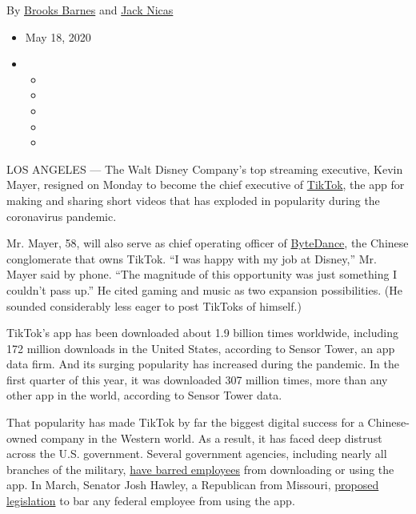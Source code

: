 By \href{https://www.nytimes3xbfgragh.onion/by/brooks-barnes}{Brooks
Barnes} and \href{https://www.nytimes3xbfgragh.onion/by/jack-nicas}{Jack
Nicas}

\begin{itemize}
\item
  May 18, 2020
\item
  \begin{itemize}
  \item
  \item
  \item
  \item
  \item
  \end{itemize}
\end{itemize}

LOS ANGELES --- The Walt Disney Company's top streaming executive, Kevin
Mayer, resigned on Monday to become the chief executive of
\href{https://www.nytimes3xbfgragh.onion/2019/10/19/style/high-school-tiktok-clubs.html?searchResultPosition=6}{TikTok},
the app for making and sharing short videos that has exploded in
popularity during the coronavirus pandemic.

Mr. Mayer, 58, will also serve as chief operating officer of
\href{https://www.nytimes3xbfgragh.onion/2018/10/29/technology/bytedance-app-funding-china.html?searchResultPosition=8}{ByteDance},
the Chinese conglomerate that owns TikTok. ``I was happy with my job at
Disney,'' Mr. Mayer said by phone. ``The magnitude of this opportunity
was just something I couldn't pass up.'' He cited gaming and music as
two expansion possibilities. (He sounded considerably less eager to post
TikToks of himself.)

TikTok's app has been downloaded about 1.9 billion times worldwide,
including 172 million downloads in the United States, according to
Sensor Tower, an app data firm. And its surging popularity has increased
during the pandemic. In the first quarter of this year, it was
downloaded 307 million times, more than any other app in the world,
according to Sensor Tower data.

That popularity has made TikTok by far the biggest digital success for a
Chinese-owned company in the Western world. As a result, it has faced
deep distrust across the U.S. government. Several government agencies,
including nearly all branches of the military,
\href{https://www.nytimes3xbfgragh.onion/2020/01/04/us/tiktok-pentagon-military-ban.html}{have
barred employees} from downloading or using the app. In March, Senator
Josh Hawley, a Republican from Missouri,
\href{https://www.congress.gov/bill/116th-congress/senate-bill/3455?s=1\&r=1}{proposed
legislation} to bar any federal employee from using the app.

